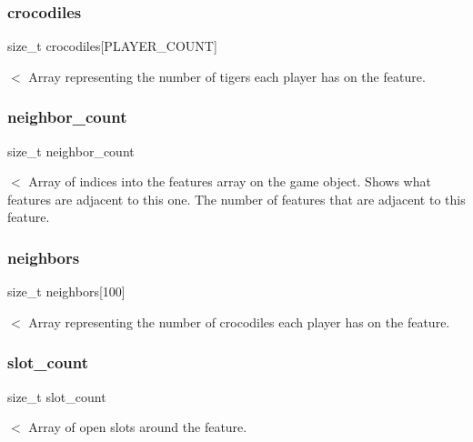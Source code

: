 \subsubsection{\texorpdfstring{crocodiles}{crocodiles}}
{\footnotesize\ttfamily size\+\_\+t crocodiles\mbox{[}P\+L\+A\+Y\+E\+R\+\_\+\+C\+O\+U\+NT\mbox{]}}

$<$ Array representing the number of tigers each player has on the feature. \hypertarget{structfeature_ae67a31fdc2a52a5556442abed084e6b9}{}\label{structfeature_ae67a31fdc2a52a5556442abed084e6b9} 
\subsubsection{\texorpdfstring{neighbor\+\_\+count}{neighbor\_count}}
{\footnotesize\ttfamily size\+\_\+t neighbor\+\_\+count}

$<$ Array of indices into the features array on the game object. Shows what features are adjacent to this one. The number of features that are adjacent to this feature. \hypertarget{structfeature_ad6c6e307f1420fd819b273c34dd3a0c5}{}\label{structfeature_ad6c6e307f1420fd819b273c34dd3a0c5} 
\subsubsection{\texorpdfstring{neighbors}{neighbors}}
{\footnotesize\ttfamily size\+\_\+t neighbors\mbox{[}100\mbox{]}}

$<$ Array representing the number of crocodiles each player has on the feature. \hypertarget{structfeature_a9e3d5a312665954040dbc946161deaef}{}\label{structfeature_a9e3d5a312665954040dbc946161deaef} 
\subsubsection{\texorpdfstring{slot\+\_\+count}{slot\_count}}
{\footnotesize\ttfamily size\+\_\+t slot\+\_\+count}

$<$ Array of open slots around the feature. \hypertarget{structfeature_abd6f925fd40b726ddc078f75b30e8293}{}\label{structfeature_abd6f925fd40b726ddc078f75b30e8293} 
